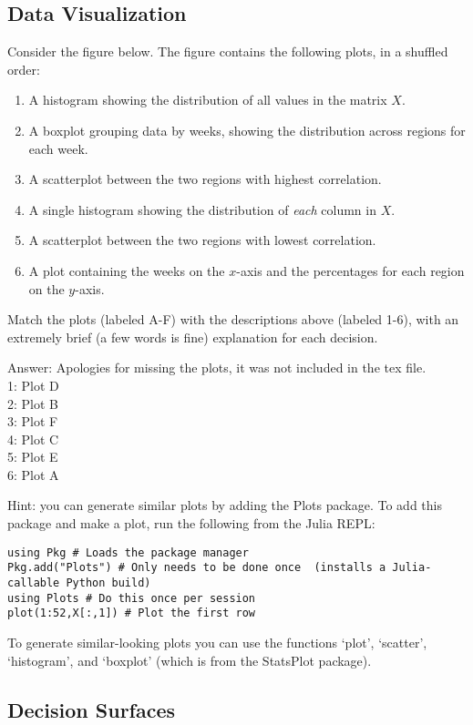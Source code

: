 \documentclass{article}
\def\ans#1{\par\gre{Answer: #1}}
\def\blu#1{{\color{blu}#1}}
\def\gre#1{{\color{gre}#1}}
\newcommand{\centerfig}[2]{\begin{center}\texttt{[image: a1f/\#2]}\end{center}}
\def\enum#1{\begin{enumerate}#1\end{enumerate}}
\begin{document}
\pagebreak



\subsection{Data Visualization}

Consider the figure below.
The figure contains the following plots, in a shuffled order:
\enum{
\item A histogram showing the distribution of all values in the matrix $X$.
\item A boxplot grouping data by weeks, showing the distribution across regions for each week.
\item A scatterplot between the two regions with highest correlation.
\item A single histogram showing the distribution of \emph{each} column in $X$.
\item A scatterplot between the two regions with lowest correlation.
\item A plot containing the weeks on the $x$-axis and the percentages for each region on the $y$-axis.
}
\blu{Match the plots (labeled A-F) with the descriptions above (labeled 1-6), with an extremely brief (a few words is fine) explanation for each decision.}

\ans{Apologies for missing the plots, it was not included in the tex file.\\
1: Plot D\\
2: Plot B\\
3: Plot F\\
4: Plot C\\
5: Plot E\\
6: Plot A}

Hint: you can generate similar plots by adding the Plots package. To add this package and make a plot, run the following from the Julia REPL:
\begin{verbatim}
using Pkg # Loads the package manager
Pkg.add("Plots") # Only needs to be done once  (installs a Julia-callable Python build)
using Plots # Do this once per session
plot(1:52,X[:,1]) # Plot the first row
\end{verbatim}
To generate similar-looking plots you can use the functions `plot', `scatter', `histogram', and `boxplot' (which is from the StatsPlot package).

\pagebreak

\subsection{Decision Surfaces}
\end{document}
